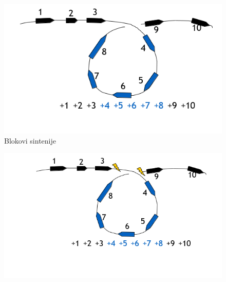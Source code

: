 \begin{minipage}{\textwidth}
	\centering
	\begin{minipage}{0.45\textwidth}
		\begin{figure}[H]
			\centering
			\includegraphics[width=\textwidth]{poglavlja/6/slike/promene1.PNG}
			\caption{Blokovi sintenije}
			\label{slika:blokovi}
		\end{figure}  
	\end{minipage}
	\hfill 
	\begin{minipage}{0.45\textwidth}
		\begin{figure}[H]
			\centering
			\includegraphics[width=\textwidth]{poglavlja/6/slike/promene2.PNG}
			\caption{}
			\label{slika:prekid}
		\end{figure} 
	\end{minipage}
	\vspace*{1em}
\end{minipage}



